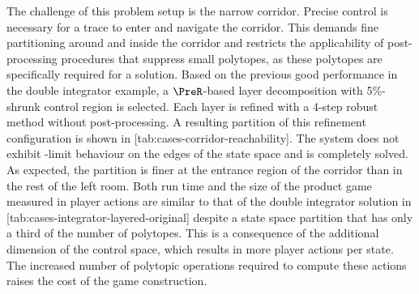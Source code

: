     The challenge of this problem setup is the narrow corridor.
    Precise control is necessary for a trace to enter and navigate the corridor.
    This demands fine partitioning around and inside the corridor and restricts the applicability of post-processing procedures that suppress small polytopes, as these polytopes are specifically required for a solution.
    Based on the previous good performance in the double integrator example, a $\PreR$-based layer decomposition with 5\%-shrunk control region is selected.
    Each layer is refined with a 4-step robust method without post-processing.
    A resulting partition of this refinement configuration is shown in [tab:cases-corridor-reachability].
    The system does not exhibit \epsilon-limit behaviour on the edges of the state space and is completely solved.
    As expected, the partition is finer at the entrance region of the corridor than in the rest of the left room.
    Both run time and the size of the product game measured in player actions are similar to that of the double integrator solution in [tab:cases-integrator-layered-original] despite a state space partition that has only a third of the number of polytopes.
    This is a consequence of the additional dimension of the control space, which results in more player actions per state.
    The increased number of polytopic operations required to compute these actions raises the cost of the game construction.

\stopsubsection


\startsubsection[title={Reachability Controller},reference=sec:cases-corridor-synthesis]


